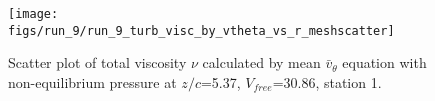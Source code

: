 \begin{figure}[H]
\centering
\texttt{[image: figs/run\_9/run\_9\_turb\_visc\_by\_vtheta\_vs\_r\_meshscatter]}
\caption{Scatter plot of total viscosity $\nu$ calculated by mean $\bar{v}_{\theta}$ equation with non-equilibrium pressure at $z/c$=5.37, $V_{free}$=30.86, station 1.}
\label{fig:run_9_turb_visc_by_vtheta_vs_r_meshscatter}
\end{figure}


